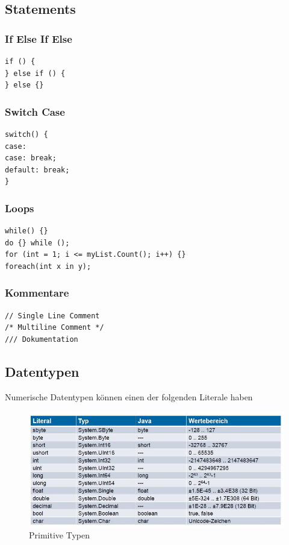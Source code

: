 \documentclass[
a4paper,
oneside,
10pt,
fleqn,
headsepline,
toc=listofnumbered, 
bibliography=totocnumbered]{scrartcl}
\begin{document}
\subsection{Statements}
\subsubsection{If Else If Else}
\begin{lstlisting}
if () {
} else if () {
} else {}
\end{lstlisting}

\subsubsection{Switch Case}
\begin{lstlisting}
switch() {
case:
case: break;
default: break;
}
\end{lstlisting}

\subsubsection{Loops}
\begin{lstlisting}
while() {}
do {} while ();
for (int = 1; i <= myList.Count(); i++) {}
foreach(int x in y);
\end{lstlisting}

\subsubsection{Kommentare}
\begin{lstlisting}
// Single Line Comment
/* Multiline Comment */
/// Dokumentation
\end{lstlisting}

\clearpage

\subsection{Datentypen}

Numerische Datentypen können einen der folgenden Literale haben
\begin{figure}[h!]
\centering
\includegraphics[width=0.8\linewidth]{images/primitive_types}
\caption{Primitive Typen}
\label{fig:primitivetypes}
\end{figure}
\end{document}
